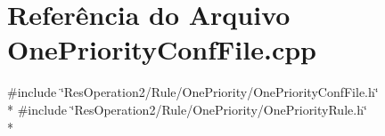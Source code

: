 \section{Referência do Arquivo One\+Priority\+Conf\+File.\+cpp}
\label{_one_priority_conf_file_8cpp}
{\ttfamily \#include \char`\"{}Res\+Operation2/\+Rule/\+One\+Priority/\+One\+Priority\+Conf\+File.\+h\char`\"{}}\\*
{\ttfamily \#include \char`\"{}Res\+Operation2/\+Rule/\+One\+Priority/\+One\+Priority\+Rule.\+h\char`\"{}}\\*
